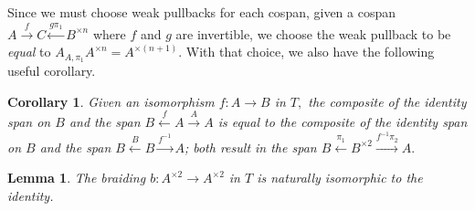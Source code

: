 \documentclass[12pt,twoside,openright]{report}
\newtheorem{lemma}{Lemma}
\newcommand{\maps}{\colon}
\newtheorem{cor}[thm]{Corollary}
\begin{document}
Since we must choose weak pullbacks for each cospan, given a cospan $A \stackrel{f}{\to} C \stackrel{g\pi_1}{\leftarrow} B^{\times n}$ where $f$ and $g$ are invertible, we choose the weak pullback to be {\em equal} to $A_{A,\pi_1}A^{\times n}=A^{\times (n+1)}.$  With that choice, we also have the following useful corollary.

\begin{cor}
  \label{reverse}
  Given an isomorphism $f\maps A \to B$ in $T,$ the composite of the identity span on $B$ and the span $B \stackrel{f}{\leftarrow} A \stackrel{A}{\to} A$ is equal to the composite of the identity span on $B$ and the span $B \stackrel{B}{\leftarrow} B \stackrel{f^{-1}}{\to} A$; both result in the span $B \stackrel{\pi_1}{\leftarrow} B^{\times 2} \stackrel{f^{-1}\pi_2}{\to} A.$
\end{cor}

\begin{lemma}
  \label{swap}
  The braiding $b:A^{\times 2} \to A^{\times 2}$ in $T$ is naturally isomorphic to the identity.
\end{lemma}
\end{document}
